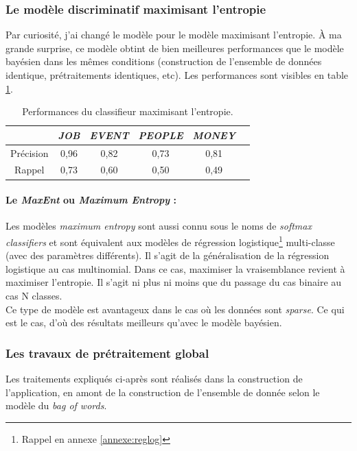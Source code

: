             \subsubsection{Le modèle discriminatif maximisant l'entropie}
                Par curiosité, j'ai changé le modèle pour le modèle maximisant l'entropie. À ma grande surprise, ce modèle obtint de bien meilleures performances que le modèle bayésien dans les mêmes conditions (construction de l'ensemble de données identique, prétraitements identiques, etc). Les performances sont visibles en table \ref{tab:classif_perf3}.
                \begin{table}[h]
                    \centering
                    \begin{tabular}{| c | c | c | c | c | c |}
                        \hline
                         & \textit{JOB} & \textit{EVENT} & \textit{PEOPLE} & \textit{MONEY} \\
                        \hline
                        Précision & 0,96 & 0,82 & 0,73 & 0,81 \\
                        Rappel & 0,73 & 0,60 & 0,50 & 0,49 \\
                        \hline
                    \end{tabular}
                    \caption{Performances du classifieur maximisant l'entropie.}
                    \label{tab:classif_perf3}
                \end{table}

                \paragraph{Le \textit{MaxEnt} ou \textit{Maximum Entropy} :}
                    Les modèles \textit{maximum entropy} sont aussi connu sous le noms de \textit{softmax classifiers} et sont équivalent aux modèles de régression logistique\footnote{Rappel en annexe \ref{annexe:reglog}} multi-classe (avec des paramètres différents). Il s'agit de la généralisation de la régression logistique au cas multinomial. Dans ce cas, maximiser la vraisemblance revient à maximiser l'entropie. Il s'agit ni plus ni moins que du passage du cas binaire au cas N classes.\\
                    Ce type de modèle est avantageux dans le cas où les données sont \textit{sparse}. Ce qui est le cas, d'où des résultats meilleurs qu'avec le modèle bayésien.

            \subsubsection{Les travaux de prétraitement global}
            \label{ssubsec:travaux_globaux}
                Les traitements expliqués ci-après sont réalisés dans la construction de l'application, en amont de la construction de l'ensemble de donnée selon le modèle du \textit{bag of words}.

